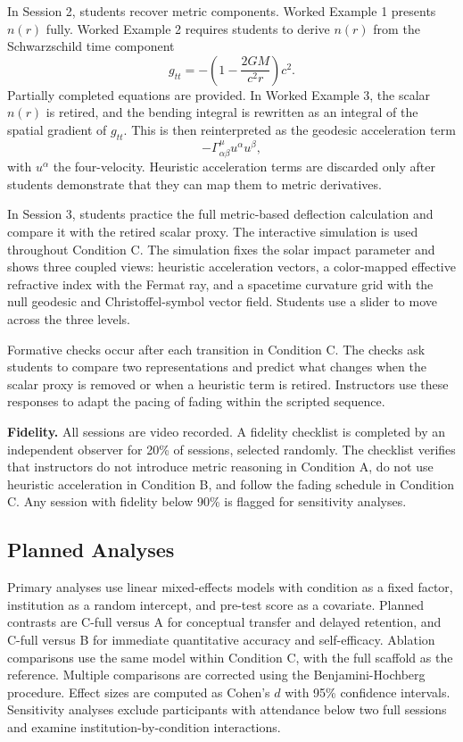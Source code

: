 \documentclass{article}
\begin{document}
In Session 2, students recover metric components. Worked Example 1 presents \(n(r)\) fully. Worked Example 2 requires students to derive \(n(r)\) from the Schwarzschild time component
\[
g_{tt} = -\left(1-\frac{2GM}{c^{2}r}\right)c^{2}.
\]
Partially completed equations are provided. In Worked Example 3, the scalar \(n(r)\) is retired, and the bending integral is rewritten as an integral of the spatial gradient of \(g_{tt}\). This is then reinterpreted as the geodesic acceleration term
\[
-\Gamma^{\mu}_{\alpha\beta}u^{\alpha}u^{\beta},
\]
with \(u^{\alpha}\) the four-velocity. Heuristic acceleration terms are discarded only after students demonstrate that they can map them to metric derivatives.

In Session 3, students practice the full metric-based deflection calculation and compare it with the retired scalar proxy. The interactive simulation is used throughout Condition C. The simulation fixes the solar impact parameter and shows three coupled views: heuristic acceleration vectors, a color-mapped effective refractive index with the Fermat ray, and a spacetime curvature grid with the null geodesic and Christoffel-symbol vector field. Students use a slider to move across the three levels.

Formative checks occur after each transition in Condition C. The checks ask students to compare two representations and predict what changes when the scalar proxy is removed or when a heuristic term is retired. Instructors use these responses to adapt the pacing of fading within the scripted sequence.

\textbf{Fidelity.} All sessions are video recorded. A fidelity checklist is completed by an independent observer for 20\% of sessions, selected randomly. The checklist verifies that instructors do not introduce metric reasoning in Condition A, do not use heuristic acceleration in Condition B, and follow the fading schedule in Condition C. Any session with fidelity below 90\% is flagged for sensitivity analyses.

\subsection{Planned Analyses}

Primary analyses use linear mixed-effects models with condition as a fixed factor, institution as a random intercept, and pre-test score as a covariate. Planned contrasts are C-full versus A for conceptual transfer and delayed retention, and C-full versus B for immediate quantitative accuracy and self-efficacy. Ablation comparisons use the same model within Condition C, with the full scaffold as the reference. Multiple comparisons are corrected using the Benjamini-Hochberg procedure. Effect sizes are computed as Cohen's \(d\) with 95\% confidence intervals. Sensitivity analyses exclude participants with attendance below two full sessions and examine institution-by-condition interactions.
\end{document}
